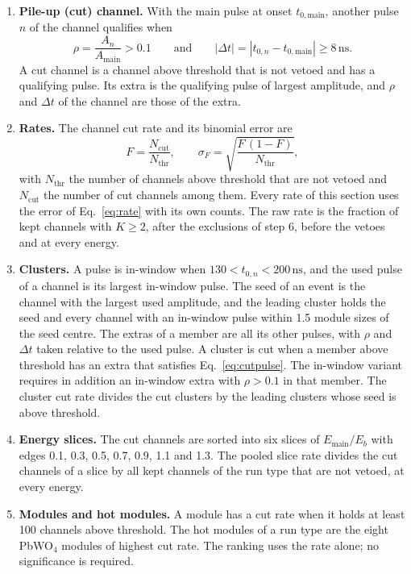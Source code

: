 \documentclass[11pt]{article}
\newcommand{\ns}{\,\mathrm{ns}}
\begin{document}
\begin{enumerate}
\item \textbf{Pile-up (cut) channel.} With the main pulse at onset $t_{0,\mathrm{main}}$, another pulse $n$ of the channel qualifies when
\begin{equation}
\rho = \frac{A_n}{A_{\mathrm{main}}} > 0.1
\qquad\text{and}\qquad
|\Delta t| = |t_{0,n} - t_{0,\mathrm{main}}| \ge 8\ns .
\label{eq:cutpulse}
\end{equation}
A cut channel is a channel above threshold that is not vetoed and has a qualifying pulse. Its extra is the qualifying pulse of largest amplitude, and $\rho$ and $\Delta t$ of the channel are those of the extra.
\item \textbf{Rates.} The channel cut rate and its binomial error are
\begin{equation}
F = \frac{N_{\mathrm{cut}}}{N_{\mathrm{thr}}},
\qquad
\sigma_F = \sqrt{\frac{F\,(1 - F)}{N_{\mathrm{thr}}}} ,
\label{eq:rate}
\end{equation}
with $N_{\mathrm{thr}}$ the number of channels above threshold that are not vetoed and $N_{\mathrm{cut}}$ the number of cut channels among them. Every rate of this section uses the error of Eq.~\eqref{eq:rate} with its own counts. The raw rate is the fraction of kept channels with $K \ge 2$, after the exclusions of step 6, before the vetoes and at every energy.
\item \textbf{Clusters.} A pulse is in-window when $130 < t_{0,n} < 200\ns$, and the used pulse of a channel is its largest in-window pulse. The seed of an event is the channel with the largest used amplitude, and the leading cluster holds the seed and every channel with an in-window pulse within 1.5 module sizes of the seed centre. The extras of a member are all its other pulses, with $\rho$ and $\Delta t$ taken relative to the used pulse. A cluster is cut when a member above threshold has an extra that satisfies Eq.~\eqref{eq:cutpulse}. The in-window variant requires in addition an in-window extra with $\rho > 0.1$ in that member. The cluster cut rate divides the cut clusters by the leading clusters whose seed is above threshold.
\item \textbf{Energy slices.} The cut channels are sorted into six slices of $E_{\mathrm{main}}/E_b$ with edges 0.1, 0.3, 0.5, 0.7, 0.9, 1.1 and 1.3. The pooled slice rate divides the cut channels of a slice by all kept channels of the run type that are not vetoed, at every energy.
\item \textbf{Modules and hot modules.} A module has a cut rate when it holds at least 100 channels above threshold. The hot modules of a run type are the eight PbWO$_4$ modules of highest cut rate. The ranking uses the rate alone; no significance is required.
\end{enumerate}
\end{document}
